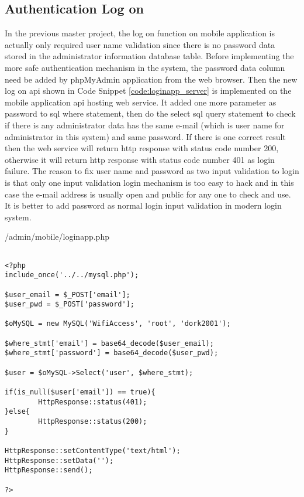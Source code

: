\subsection{Authentication Log on}
\par In the previous master project, the log on function on mobile application is actually only required user name validation since there is no password data stored in the administrator information database table. Before implementing the more safe authentication mechanism in the system, the password data column need be added by phpMyAdmin application from the web browser. Then the new log on \gls{api} shown in Code Snippet \ref{code:loginapp_server} is implemented on the mobile application \gls{api} hosting web service. It added one more parameter as password to \gls{sql} where statement, then do the select \gls{sql} query statement to check if there is any administrator data has the same e-mail (which is user name for administrator in this system) and same password. If there is one correct result then the web service will return \gls{http} response with status code number 200, otherwise it will return \gls{http} response with status code number 401 as login failure. The reason to fix user name and password as two input validation to login is that only one input validation login mechanism is too easy to hack and in this case the e-mail address is usually open and public for any one to check and use. It is better to add password as normal login input validation in modern login system.

\begin{algorithm}[h]
  \caption{ /admin/mobile/loginapp.php}
  \label{code:loginapp_server}
  \begin{verbatim}
  
<?php
include_once('../../mysql.php');

$user_email = $_POST['email'];
$user_pwd = $_POST['password'];

$oMySQL = new MySQL('WifiAccess', 'root', 'dork2001');

$where_stmt['email'] = base64_decode($user_email);
$where_stmt['password'] = base64_decode($user_pwd);

$user = $oMySQL->Select('user', $where_stmt);

if(is_null($user['email']) == true){
        HttpResponse::status(401);
}else{
        HttpResponse::status(200);
}

HttpResponse::setContentType('text/html');
HttpResponse::setData('');
HttpResponse::send();

?>
 \end{verbatim}
\end{algorithm}

